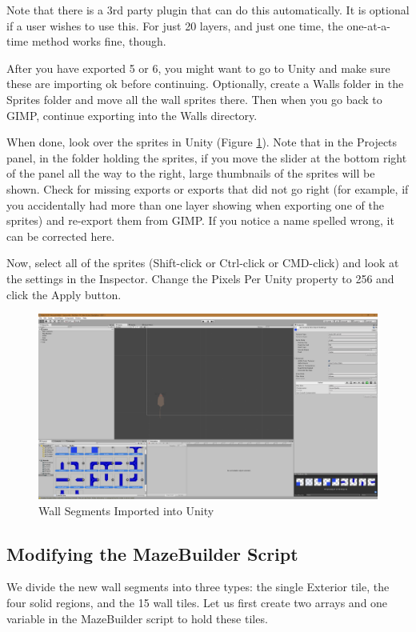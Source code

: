 \documentclass[12pt]{amsbook}
\theoremstyle{definition}
\theoremstyle{remark}
\numberwithin{figure}{chapter}
\numberwithin{table}{chapter}
\numberwithin{section}{chapter}
\numberwithin{equation}{section}
\begin{document}
Note that there is a 3rd party plugin that can do this automatically.  It is optional if a user wishes to use this.  For just 20 layers, and just one time, the one-at-a-time method works fine, though.

After you have exported 5 or 6, you might want to go to Unity and make sure these are importing ok before continuing.  Optionally, create a Walls folder in the Sprites folder and move all the wall sprites there.  Then when you go back to GIMP, continue exporting into the Walls directory.

When done, look over the sprites in Unity (Figure \ref{fig:import-wall-segments}).  Note that in the Projects panel, in the folder holding the sprites, if you move the slider at the bottom right of the panel all the way to the right, large thumbnails of the sprites will be shown. Check for missing exports or exports that did not go right (for example, if you accidentally had more than one layer showing when exporting one of the sprites) and re-export them from GIMP.  If you notice a name spelled wrong, it can be corrected here.

Now, select all of the sprites (Shift-click or Ctrl-click or CMD-click) and look at the settings in the Inspector.  Change the Pixels Per Unity property to 256 and click the Apply button.

\begin{figure}[h]
  \includegraphics[width=6in]{ImportWallSegments.png}
  \caption{Wall Segments Imported into Unity}
  \label{fig:import-wall-segments}
\end{figure}


\subsection{Modifying the MazeBuilder Script}
We divide the new wall segments into three types: the single Exterior tile, the four solid regions, and the 15 wall tiles.  Let us first create two arrays and one variable in the MazeBuilder script to hold these tiles.
\end{document}
